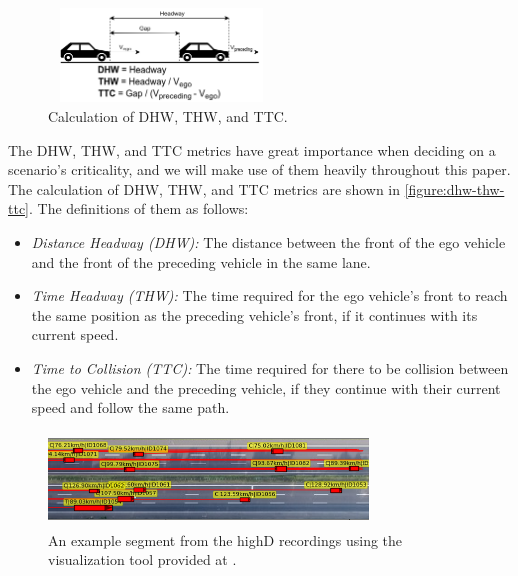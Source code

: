 \documentclass[conference]{IEEEtran}
\begin{document}
\begin{figure}[!h]
  \begin{center}
  	\includegraphics[width=6cm,height=2.5cm]{./images/dhw_thw_ttc}
  \end{center}
  \caption{Calculation of DHW, THW, and TTC.}
  \label{figure:dhw-thw-ttc}
\end{figure}

The DHW, THW, and TTC metrics have great importance when deciding on a scenario's criticality, and we will make use of them heavily throughout this paper. The calculation of DHW, THW, and TTC metrics are shown in \autoref{figure:dhw-thw-ttc}. The definitions of them as follows:

\begin{itemize}
	\item \textit{Distance Headway (DHW):} The distance between the front of the ego vehicle and the front of the preceding vehicle in the same lane.
	\item \textit{Time Headway (THW):} The time required for the ego vehicle's front to reach the same position as the preceding vehicle's front, if it continues with its current speed.
	\item \textit{Time to Collision (TTC):} The time required for there to be collision between the ego vehicle and the preceding vehicle, if they continue with their current speed and follow the same path.
\end{itemize}

\begin{figure}[!h]
  \begin{center}
  	\includegraphics[width=8.5cm,height=2.5cm]{./images/highd-example}
  \end{center}
  \caption{An example segment from the highD recordings using the visualization tool provided at \cite{highdtools}.}
  \label{figure:highd example}
\end{figure} 
\end{document}
